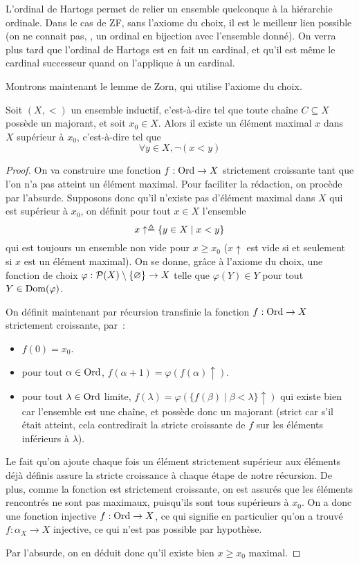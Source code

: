 L'ordinal de Hartogs permet de relier un ensemble quelconque à la hiérarchie
ordinale. Dans le cas de ZF, sans l'axiome du choix, il est le meilleur lien
possible (on ne connait pas, , un ordinal en bijection avec
l'ensemble donné). On verra plus tard que l'ordinal de Hartogs est en fait un
cardinal, et qu'il est même le cardinal successeur quand on l'applique à un
cardinal.

Montrons maintenant le lemme de Zorn, qui utilise l'axiome du choix.

\begin{theorem}\label{thm.ordi.Zorn}
  Soit $(X,<)$ un ensemble inductif, c'est-à-dire tel que toute chaîne
  $C\subseteq X$ possède un majorant, et soit $x_0\in X$. Alors il existe un
  élément maximal $x$ dans $X$ supérieur à $x_0$, c'est-à-dire tel que
  \[\forall y \in X, \lnot (x < y)\]
\end{theorem}

\begin{proof}
  On va construire une fonction $f : \operatorname{Ord} \to X$ strictement croissante tant que
  l'on n'a pas atteint un élément maximal. Pour faciliter la rédaction, on
  procède par l'absurde. Supposons donc qu'il n'existe pas d'élément maximal
  dans $X$ qui est supérieur à $x_0$, on définit pour tout $x\in X$ l'ensemble
  \[x\uparrow\triangleq \{y \in X \mid x < y\}\]
  qui est toujours un ensemble non vide pour $x \geq x_0$ ($x\uparrow$ est vide
  si et seulement si $x$ est un élément maximal). On se donne, grâce à l'axiome
  du choix, une fonction de choix
  $\varphi : \mathcal{P}(X)\setminus\{\varnothing\}\to X$ telle que
  $\varphi(Y) \in Y$ pour tout $Y\in\operatorname{Dom}(\varphi)$.

  On définit maintenant par récursion transfinie la fonction $f : \operatorname{Ord}\to X$
  strictement croissante, par~:
  \begin{itemize}
  \item $f(0) = x_0$.
  \item pour tout $\alpha\in\operatorname{Ord}$, $f(\alpha+1) = \varphi(f(\alpha)\uparrow)$.
  \item pour tout $\lambda\in\operatorname{Ord}$ limite,
    $f(\lambda) = \varphi(\{f(\beta)\mid \beta < \lambda\}\uparrow)$ qui existe
    bien car l'ensemble est une chaîne, et possède donc un majorant (strict car
    s'il était atteint, cela contredirait la stricte croissante de $f$
    sur les éléments inférieurs à $\lambda$).
  \end{itemize}
  Le fait qu'on ajoute chaque fois un élément strictement supérieur aux éléments
  déjà définis assure la stricte croissance à chaque étape de notre récursion.
  De plus, comme la fonction est strictement croissante, on est assurés que
  les éléments rencontrés ne sont pas maximaux, puisqu'ils sont tous supérieurs
  à $x_0$. On a donc une fonction injective $f : \operatorname{Ord} \to X$, ce qui signifie en
  particulier qu'on a trouvé $f : \alpha_X\to X$ injective, ce qui n'est pas
  possible par hypothèse.

  Par l'absurde, on en déduit donc qu'il existe bien $x \geq x_0$ maximal.
\end{proof}

